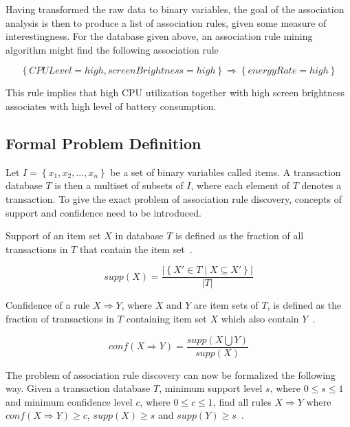 
Having transformed the raw data to binary variables, the goal of the association analysis is then to produce a list of association rules, given some measure of interestingness. For the database given above, an association rule mining algorithm might find the following association rule 

\[
	\left\{ CPULevel=high, screenBrightness=high \right\} \Rightarrow \left\{ energyRate=high \right\}
\]

This rule implies that high CPU utilization together with high screen brightness associates with high level of battery consumption.

\subsection{Formal Problem Definition}

Let $I = \left\{ x_1, x_2, ..., x_n \right\}$ be a set of binary variables called items. A transaction database $T$ is then a multiset of subsets of $I$, where each element of $T$ denotes a transaction. To give the exact problem of association rule discovery, concepts of support and confidence need to be introduced.

Support of an item set $X$ in database $T$ is defined as the fraction of all transactions in $T$ that contain the item set~\cite{Hipp:2000:AAR:360402.360421}.

\[ supp(X) = \dfrac{ \vert \left\{ X' \in T  \mid X \subseteq X'  \right\}  \vert }{ \vert T \vert  } \]

Confidence of a rule $X \Rightarrow Y$, where $X$ and $Y$ are item sets of $T$, is defined as the fraction of transactions in $T$ containing item set $X$ which also contain $Y$~\cite{Hipp:2000:AAR:360402.360421}.

\[conf( X \Rightarrow Y) = \dfrac{ supp( X \bigcup Y ) }{ supp(X) } \]

The problem of association rule discovery can now be formalized the following way. Given a transaction database $T$, minimum support level $s$, where $ 0 \leq s \leq 1 $ and minimum confidence level $c$, where $ 0 \leq c \leq 1 $, find all rules $X \Rightarrow Y$ where $conf( X \Rightarrow Y ) \geq c$, $supp(X) \geq s$ and $supp(Y) \geq s$~\cite{Hipp:2000:AAR:360402.360421}. 

